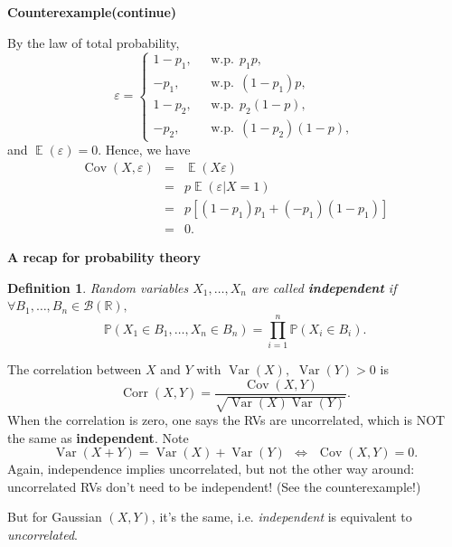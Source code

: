 \documentclass[19pt,landscaoe]{article}
\newtheorem{defi}[thm]{Definition}
\newcommand{\IP}{\mathbb{P}}
\DeclareMathOperator{\E}{\mathbb{E}}
\newcommand{\R}{\mathbb{R}}
\DeclareMathOperator{\Var}{\mathrm{Var}}
\DeclareMathOperator{\var}{\mathrm{Var}}
\DeclareMathOperator{\cov}{\mathrm{Cov}}
\DeclareMathOperator{\corr}{\mathrm{Corr}}
\begin{document}
\newpage
{\LARGE\centerline{\textbf{Counterexample(continue)}}}
\vskip25pt
\begin{minipage}{.9\textwidth}
    \Large 
    By the law of total probability, 
    \begin{equation*}
        \varepsilon=\begin{cases}
            1-p_1,~~~&\mathrm{w.p.}~~p_1p,\\
            -p_1,~~~&\mathrm{w.p.}~~(1-p_1)p,\\
            1-p_2,~~~&\mathrm{w.p.}~~p_2(1-p),\\
            -p_2,~~~&\mathrm{w.p.}~~(1-p_2)(1-p),
        \end{cases}
    \end{equation*}
 and  $\E(\varepsilon)=0$. Hence, we have 
   \begin{eqnarray*}
    \cov(X,\varepsilon)&=&\E(X\varepsilon)\\
    &=&p\E(\varepsilon|X=1)\\
    &=&p[(1-p_1)p_1+(-p_1)(1-p_1)]\\
    &=&0.
   \end{eqnarray*}
\end{minipage}

\newpage
{\LARGE\centerline{\textbf{A recap for probability theory}}}
\vskip25pt
\begin{minipage}{.9\textwidth}
   \large
\begin{defi}
    Random variables $X_1,\dots,X_n$ are called {\bf independent} if ~$\forall B_1,\dots,B_n\in\mathcal{B}(\R),$
    $$\IP(X_1\in B_1,\dots,X_n\in B_n)=\prod_{i=1}^n\IP(X_i\in B_i).$$
\end{defi}
   The correlation between $X$ and $Y$ with $\Var(X),$ $\Var(Y)>0$ is 
   $$\corr(X,Y)=\frac{\cov(X,Y)}{\sqrt{\var(X)\var(Y)}}.$$
   When the correlation is zero, one says the RVs are uncorrelated, which is NOT the same as {\bf independent}. Note 
   $$\Var(X+Y)=\Var(X)+\Var(Y)~~\Leftrightarrow~~\cov(X,Y)=0.$$
 Again, independence implies uncorrelated, but not the other way around: uncorrelated RVs don't need to be independent! (See the counterexample!)
   
   \vskip 5pt
   But for Gaussian $(X,Y)$, it's the same, i.e. {\it independent} is equivalent to {\it uncorrelated}. 
\end{minipage}







\newpage


\end{document}
